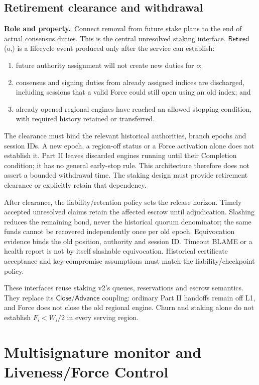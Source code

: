 \documentclass[11pt,a4paper]{article}
\newcommand{\api}[1]{\ensuremath{\mathsf{#1}}}
\newcommand{\role}{\textbf{Role and property.}\ }
\begin{document}
\subsection{Retirement clearance and withdrawal}\label{sec:retirement}
\role Connect removal from future stake plans to the end of actual
consensus duties. This is the central unresolved staking interface.
\api{Retired}(o,) is a lifecycle event produced only after
the service can establish:
\begin{enumerate}
\item future authority assignment will not create new duties for $o$;
\item consensus and signing duties from already assigned indices are
discharged, including
sessions that a valid Force could still open using an old index; and
\item already opened regional engines have reached an allowed stopping
condition, with required history retained or transferred.
\end{enumerate}
The clearance must bind the relevant historical authorities, branch
epochs and session IDs. A new epoch, a region-off status or a Force
activation alone does not establish it. Part II leaves discarded engines running until their
Completion condition; it has no general early-stop rule. This architecture
therefore does not assert a bounded withdrawal time. The staking design must
provide retirement clearance or explicitly retain that dependency.

After clearance, the liability/retention policy sets the release horizon.
Timely accepted unresolved claims retain the affected escrow until
adjudication. Slashing reduces the remaining bond, never the historical
quorum denominator; the same funds cannot be recovered independently
once per old epoch. Equivocation evidence binds the old position,
authority and session ID. Timeout BLAME or a health report is not by
itself slashable equivocation. Historical certificate acceptance and
key-compromise assumptions must match the liability/checkpoint policy.

These interfaces reuse staking v2's queues, reservations and escrow
semantics. They replace its \api{Close}/\api{Advance} coupling: ordinary
Part II handoffs remain off L1, and Force does not close the old regional
engine. Churn and staking alone do not establish $F_i<W_i/2$ in every
serving region.

\section{Multisignature monitor and Liveness/Force Control}\label{sec:force}
\end{document}
